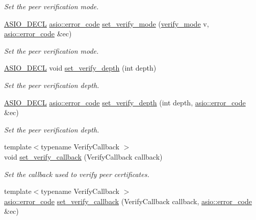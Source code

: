 \begin{DoxyCompactItemize}
\begin{DoxyCompactList}\small\item\em Set the peer verification mode. \end{DoxyCompactList}\item 
\hyperlink{config_8hpp_ab54d01ea04afeb9a8b39cfac467656b7}{A\+S\+I\+O\+\_\+\+D\+E\+C\+L} \hyperlink{classasio_1_1error__code}{asio\+::error\+\_\+code} \hyperlink{classasio_1_1ssl_1_1context_a7844f800c233092be90b38f9a56d54d3}{set\+\_\+verify\+\_\+mode} (\hyperlink{classasio_1_1ssl_1_1context__base_aa9ef38ba747dd4e8ecb1f9a279a67d6b}{verify\+\_\+mode} v, \hyperlink{classasio_1_1error__code}{asio\+::error\+\_\+code} \&ec)
\begin{DoxyCompactList}\small\item\em Set the peer verification mode. \end{DoxyCompactList}\item 
\hyperlink{config_8hpp_ab54d01ea04afeb9a8b39cfac467656b7}{A\+S\+I\+O\+\_\+\+D\+E\+C\+L} void \hyperlink{classasio_1_1ssl_1_1context_a39cc816d2a2971112f37ce4cf724ee24}{set\+\_\+verify\+\_\+depth} (int depth)
\begin{DoxyCompactList}\small\item\em Set the peer verification depth. \end{DoxyCompactList}\item 
\hyperlink{config_8hpp_ab54d01ea04afeb9a8b39cfac467656b7}{A\+S\+I\+O\+\_\+\+D\+E\+C\+L} \hyperlink{classasio_1_1error__code}{asio\+::error\+\_\+code} \hyperlink{classasio_1_1ssl_1_1context_ae10d1c4e1f952573441bc578da2e3dec}{set\+\_\+verify\+\_\+depth} (int depth, \hyperlink{classasio_1_1error__code}{asio\+::error\+\_\+code} \&ec)
\begin{DoxyCompactList}\small\item\em Set the peer verification depth. \end{DoxyCompactList}\item 
{\footnotesize template$<$typename Verify\+Callback $>$ }\\void \hyperlink{classasio_1_1ssl_1_1context_a391d6ba4e6b018059e6f7f4af96bb268}{set\+\_\+verify\+\_\+callback} (Verify\+Callback callback)
\begin{DoxyCompactList}\small\item\em Set the callback used to verify peer certificates. \end{DoxyCompactList}\item 
{\footnotesize template$<$typename Verify\+Callback $>$ }\\\hyperlink{classasio_1_1error__code}{asio\+::error\+\_\+code} \hyperlink{classasio_1_1ssl_1_1context_ade54ebf308a2c20a4a5717c33fac4bb6}{set\+\_\+verify\+\_\+callback} (Verify\+Callback callback, \hyperlink{classasio_1_1error__code}{asio\+::error\+\_\+code} \&ec)

\end{DoxyCompactItemize}
